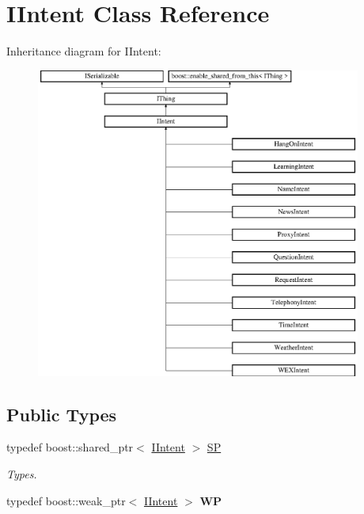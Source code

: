 \hypertarget{class_i_intent}{}\section{I\+Intent Class Reference}
\label{class_i_intent}
Inheritance diagram for I\+Intent\+:\begin{figure}[H]
\begin{center}
\leavevmode
\includegraphics[height=10.208333cm]{class_i_intent}
\end{center}
\end{figure}
\subsection*{Public Types}
\begin{DoxyCompactItemize}
\item 
\mbox{\label{class_i_intent_a2a721f97e3d6685a7ee8ca9704f1d1db}} 
typedef boost\+::shared\+\_\+ptr$<$ \hyperlink{class_i_intent}{I\+Intent} $>$ \hyperlink{class_i_intent_a2a721f97e3d6685a7ee8ca9704f1d1db}{SP}
\begin{DoxyCompactList}\small\item\em Types. \end{DoxyCompactList}\item 
\mbox{\label{class_i_intent_acb29fc08e37407d34bbecbc0665f39fd}} 
typedef boost\+::weak\+\_\+ptr$<$ \hyperlink{class_i_intent}{I\+Intent} $>$ {\bfseries WP}
\end{DoxyCompactItemize}
